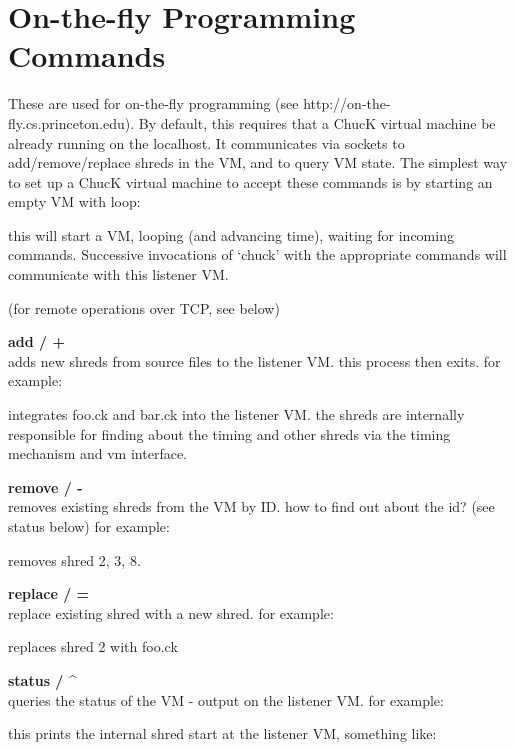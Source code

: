 \chapter{On-the-fly Programming Commands}

These are used for on-the-fly programming (see http://on-the-fly.cs.princeton.edu). By default, this requires that a ChucK virtual machine be already running on the localhost. It communicates via sockets to add/remove/replace shreds in the VM, and to query VM state. The simplest way to set up a ChucK virtual machine to accept these commands is by starting an empty VM with \doubledash loop: 


this will start a VM, looping (and advancing time), waiting for incoming commands. Successive invocations of `chuck' with the appropriate commands will communicate with this listener VM. 

(for remote operations over TCP, see below) 


{\bf \doubledash add / +}\\
adds new shreds from source files to the listener VM. this process then exits.  for example: 


integrates foo.ck and bar.ck into the listener VM. the shreds are internally responsible for finding about the timing and other shreds via the timing mechanism and vm interface. 

{\bf \doubledash remove / - }\\
removes existing shreds from the VM by ID. how to find out about the id? (see \doubledash status below) for example: 


removes shred 2, 3, 8. 

{\bf \doubledash replace / =}\\
replace existing shred with a new shred. for example: 


replaces shred 2 with foo.ck 

{\bf \doubledash status / \^{} }\\
queries the status of the VM - output on the listener VM. for example: 


this prints the internal shred start at the listener VM, something like: 

